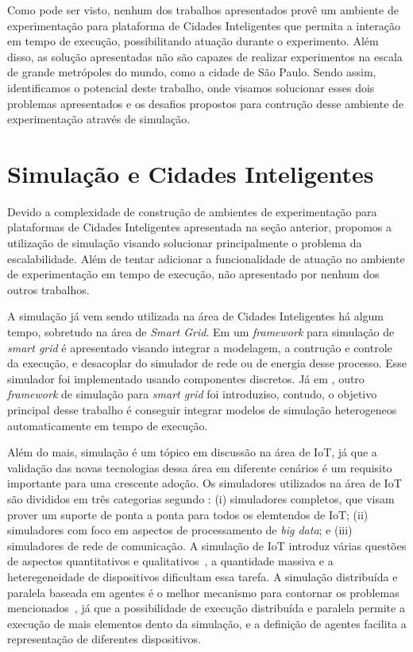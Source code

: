 Como pode ser visto, nenhum dos trabalhos apresentados provê um ambiente de experimentação para plataforma de Cidades Inteligentes que permita a interação em tempo de execução, possibilitando
atuação durante o experimento.
Além disso, as solução apresentadas não são capazes de realizar experimentos na escala de grande metrópoles do mundo, como a cidade de São Paulo.
Sendo assim, identificamos o potencial deste trabalho, onde visamos solucionar esses dois problemas apresentados e os desafios propostos para contrução desse ambiente de experimentação através
de simulação.

\section{Simulação e Cidades Inteligentes}

Devido a complexidade de construção de ambientes de experimentação para plataformas de Cidades Inteligentes apresentada na seção anterior, propomos a utilização de simulação visando solucionar
principalmente o problema da escalabilidade.
Além de tentar adicionar a funcionalidade de atuação no ambiente de experimentação em tempo de execução, não apresentado por nenhum dos outros trabalhos.

A simulação já vem sendo utilizada na área de Cidades Inteligentes há algum tempo, sobretudo na área de \textit{Smart Grid}.
Em \cite{jsan_2016} um \textit{framework} para simulação de \textit{smart grid} é apresentado visando integrar a modelagem, a contrução e controle da execução, e desacoplar do simulador de rede
ou de energia desse processo.
Esse simulador foi implementado usando componentes discretos.
Já em \cite{schutte_2011}, outro \textit{framework} de simulação para \textit{smart grid} foi introduziso, contudo, o objetivo principal desse trabalho é conseguir integrar modelos de simulação
heterogeneos automaticamente em tempo de execução.

Além do mais, simulação é um tópico em discussão na área de IoT, já que a validação das novas tecnologias dessa área em diferente cenários é um requisito importante para uma crescente adoção.
Os simuladores utilizados na área de IoT são divididos em três categorias segundo \cite{baig_2018}:
(i) simuladores completos, que visam prover um suporte de ponta a ponta para todos os elemtendos de IoT;
(ii) simuladores com foco em aspectos de processamento de \textit{big data};
e (iii) simuladores de rede de comunicação.
A simulação de IoT introduz várias questões de aspectos quantitativos e qualitativos~\cite{angelo_2016}, a quantidade massiva e a heteregeneidade de dispositivos dificultam essa tarefa.
A simulação distribuída e paralela baseada em agentes é o melhor mecanismo para contornar os problemas mencionados~\cite{angelo_2016}, já que a possibilidade de execução distribuída e paralela permite
a execução de mais elementos dento da simulação, e a definição de agentes facilita a representação de diferentes dispositivos.

